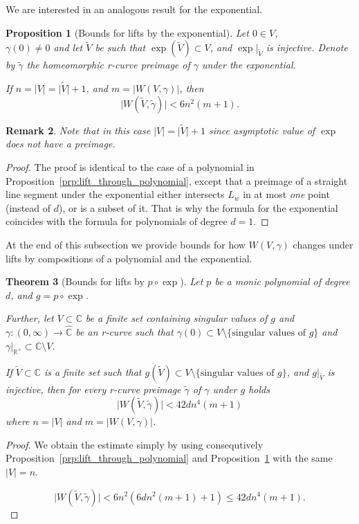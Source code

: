\documentclass[10pt,reqno,a4paper]{amsart}
\numberwithin{figure}{section}
\numberwithin{equation}{section}
\newtheorem{thm}{Theorem}[section]
\newtheorem{prp}[thm]{Proposition}
\newtheorem{remark}[thm]{Remark}
\newcommand{\abs}[1]{\lvert #1 \rvert}
\begin{document}
We are interested in an analogous result for the exponential.

\begin{prp}[Bounds for lifts by the exponential]
	\label{prp:lift_through_exponential}
	Let $0\in V$,\,\\ $\gamma(0)\neq 0$ and let $\tilde{V}$ be such that $\exp(\tilde{V})\subset V$, and $\exp|_{\tilde{V}}$ is injective. Denote by $\tilde{\gamma}$ the homeomorphic r-curve preimage of $\gamma$ under the exponential.
	
	If $n=\abs{V}=\abs{\tilde{V}}+1$, and $m=\abs{W(V,\gamma)}$, then $$\abs{W(\tilde{V},\tilde{\gamma})}<6n^2(m+1).$$		
\end{prp}
\begin{remark}
	Note that in this case $\abs{V}=\abs{\tilde{V}}+1$ since asymptotic value of $\exp$ does not have a preimage.	
\end{remark}
\begin{proof}
	The proof is identical to the case of a polynomial in Proposition~\ref{prp:lift_through_polynomial}, except that a preimage of a straight line segment under the exponential either intersects $L_w$ in at most \emph{one} point (instead of $d$), or is a subset of it. That is why the formula for the exponential coincides with the formula for polynomials of degree $d=1$.	
\end{proof}

At the end of this subsection we provide bounds for how $W(V,\gamma)$ changes under lifts by compositions of a polynomial and the exponential.

\begin{thm}[Bounds for lifts by $p\circ\exp$]
	\label{thm:lift_through_composition}
	Let $p$ be a monic polynomial of degree $d$, and $g=p\circ\exp$.
	
	Further, let $V\subset\mathbb{C}$ be a finite set containing singular values of $g$ and $\gamma:(0,\infty)\to\hat{\mathbb{C}}$ be an r-curve such that $\gamma(0)\subset V\setminus\{\text{singular values of }g\}$ and $\gamma|_{\mathbb{R}^+}\subset\mathbb{C}\setminus V$. 
	
	If $\tilde{V}\subset\mathbb{C}$ is a finite set such that $g(\tilde{V})\subset V\setminus\{\text{singular values of }g\}$, and $g|_{\tilde{V}}$ is injective, then for every r-curve preimage $\tilde{\gamma}$ of $\gamma$ under $g$ holds
	$$\abs{W(\tilde{V},\tilde{\gamma})}<42dn^4(m+1)$$
	where $n=\abs{V}$ and $m=\abs{W(V,\gamma)}$.	
\end{thm}
\begin{proof}
We obtain the estimate simply by using consequtively Proposition~\ref{prp:lift_through_polynomial} and Proposition~\ref{prp:lift_through_exponential} with the same $\abs{V}=n$.

$$\abs{W(\tilde{V},\tilde{\gamma})}<6n^2(6dn^2(m+1)+1)\leq 42dn^4(m+1).$$
\end{proof}
 
\end{document}
